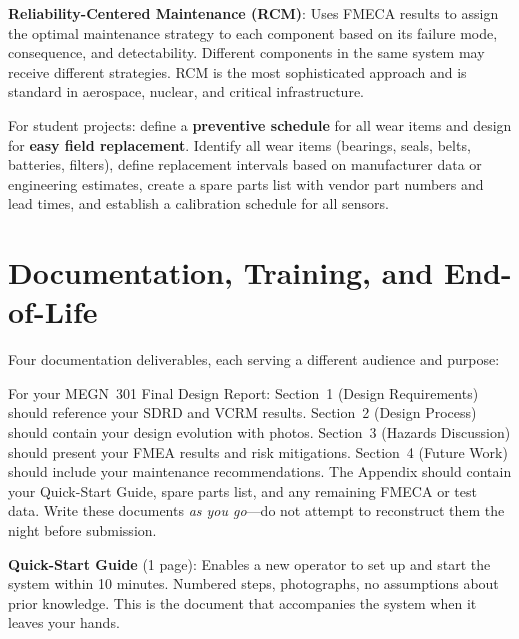 \documentclass[11pt,letterpaper,twoside,openany]{book}
\begin{document}
\textbf{Reliability-Centered Maintenance (RCM)}: Uses FMECA results to assign the optimal maintenance strategy to each component based on its failure mode, consequence, and detectability. Different components in the same system may receive different strategies. RCM is the most sophisticated approach and is standard in aerospace, nuclear, and critical infrastructure.

For student projects: define a \textbf{preventive schedule} for all wear items and design for \textbf{easy field replacement}. Identify all wear items (bearings, seals, belts, batteries, filters), define replacement intervals based on manufacturer data or engineering estimates, create a spare parts list with vendor part numbers and lead times, and establish a calibration schedule for all sensors.

\FloatBarrier
\section{Documentation, Training, and End-of-Life}
Four documentation deliverables, each serving a different audience and purpose:

\begin{tipbox}
For your MEGN~301 Final Design Report: Section~1 (Design Requirements) should reference your SDRD and VCRM results. Section~2 (Design Process) should contain your design evolution with photos. Section~3 (Hazards Discussion) should present your FMEA results and risk mitigations. Section~4 (Future Work) should include your maintenance recommendations. The Appendix should contain your Quick-Start Guide, spare parts list, and any remaining FMECA or test data. Write these documents \emph{as you go}---do not attempt to reconstruct them the night before submission.
\end{tipbox}

\textbf{Quick-Start Guide} (1 page): Enables a new operator to set up and start the system within 10 minutes. Numbered steps, photographs, no assumptions about prior knowledge. This is the document that accompanies the system when it leaves your hands.
\end{document}
